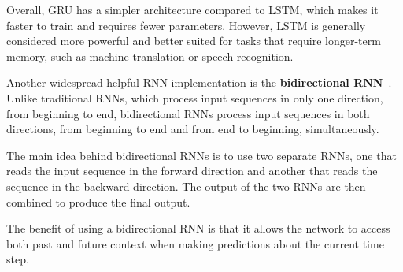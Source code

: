 Overall, \ac{GRU} has a simpler architecture compared to \ac{LSTM}, which makes it faster to train and requires fewer parameters. However, \ac{LSTM} is generally considered more powerful and better suited for tasks that require longer-term memory, such as machine translation or speech recognition.

Another widespread helpful \ac{RNN} implementation is the \textbf{bidirectional \ac{RNN}}~\cite{schuster_bidirectional_1997}. Unlike traditional \acp{RNN}, which process input sequences in only one direction, from beginning to end, bidirectional \acp{RNN} process input sequences in both directions, from beginning to end and from end to beginning, simultaneously.

The main idea behind bidirectional \acp{RNN} is to use two separate \acp{RNN}, one that reads the input sequence in the forward direction and another that reads the sequence in the backward direction. The output of the two \acp{RNN} are then combined to produce the final output.

The benefit of using a bidirectional \ac{RNN} is that it allows the network to access both past and future context when making predictions about the current time step.